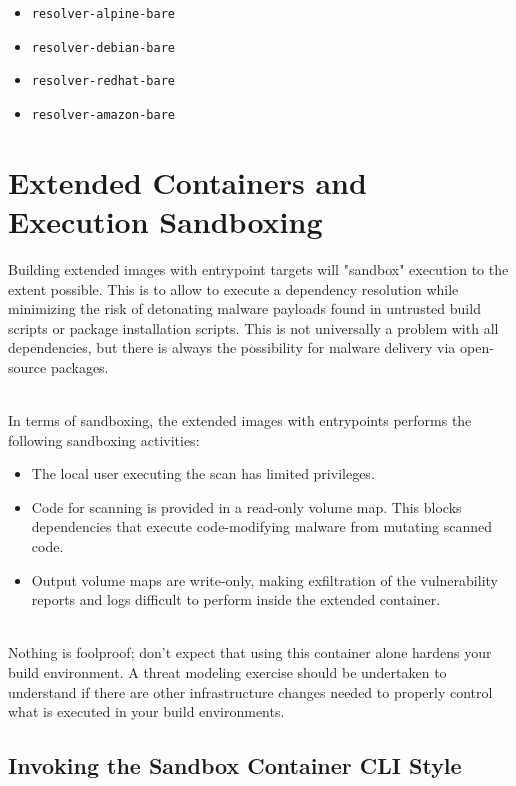 \begin{itemize}
    \item \texttt{resolver-alpine-bare}
    \item \texttt{resolver-debian-bare}
    \item \texttt{resolver-redhat-bare}
    \item \texttt{resolver-amazon-bare}
\end{itemize}


\section{Extended Containers and Execution Sandboxing}

Building extended images with entrypoint targets will "sandbox" \scaresolver execution 
to the extent possible. This is to allow \scaresolver to execute a dependency resolution
while minimizing the risk of detonating malware payloads found in untrusted build scripts or 
package installation scripts. This is not universally a problem with all dependencies, but 
there is always the possibility for malware delivery via open-source packages. 

\noindent\\In terms of sandboxing, the extended images with entrypoints performs the following sandboxing
activities:

\begin{itemize}
    \item The local user executing the scan has limited privileges.
    \item Code for scanning is provided in a read-only volume map.
    This blocks dependencies that execute code-modifying malware from mutating scanned code.
    \item Output volume maps are write-only, making exfiltration of the vulnerability reports and logs
    difficult to perform inside the extended container.
\end{itemize}

\noindent\\Nothing is foolproof; don't expect that using this container alone hardens your build
environment.  A threat modeling exercise should be undertaken to understand
if there are other infrastructure changes needed to properly control what is executed in your
build environments.

\subsection{Invoking the Sandbox Container CLI Style}\label{ssec:invoking_cli}

